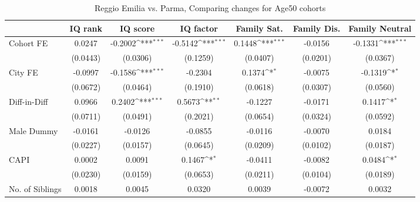 \begin{table}[htbp]\centering
\def\sym#1{\ifmmode^{#1}\else\(^{#1}\)\fi}
\caption{Reggio Emilia vs. Parma, Comparing changes for Age50 cohorts}
\begin{tabular}{l*{6}{c}}
\toprule
            &\multicolumn{1}{c}{IQ rank}&\multicolumn{1}{c}{IQ score}&\multicolumn{1}{c}{IQ factor}&\multicolumn{1}{c}{Family Sat.}&\multicolumn{1}{c}{Family Dis.}&\multicolumn{1}{c}{Family Neutral}\\
\midrule
Cohort FE   &      0.0247         &     -0.2002\sym{***}&     -0.5142\sym{***}&      0.1448\sym{***}&     -0.0156         &     -0.1331\sym{***}\\
            &    (0.0443)         &    (0.0306)         &    (0.1259)         &    (0.0407)         &    (0.0201)         &    (0.0367)         \\
\addlinespace
City FE     &     -0.0997         &     -0.1586\sym{***}&     -0.2304         &      0.1374\sym{*}  &     -0.0075         &     -0.1319\sym{*}  \\
            &    (0.0672)         &    (0.0464)         &    (0.1910)         &    (0.0618)         &    (0.0307)         &    (0.0560)         \\
\addlinespace
Diff-in-Diff&      0.0966         &      0.2402\sym{***}&      0.5673\sym{**} &     -0.1227         &     -0.0171         &      0.1417\sym{*}  \\
            &    (0.0711)         &    (0.0491)         &    (0.2021)         &    (0.0654)         &    (0.0324)         &    (0.0592)         \\
\addlinespace
Male Dummy  &     -0.0161         &     -0.0126         &     -0.0855         &     -0.0116         &     -0.0070         &      0.0184         \\
            &    (0.0227)         &    (0.0157)         &    (0.0645)         &    (0.0209)         &    (0.0102)         &    (0.0187)         \\
\addlinespace
CAPI        &      0.0002         &      0.0091         &      0.1467\sym{*}  &     -0.0411         &     -0.0082         &      0.0484\sym{*}  \\
            &    (0.0230)         &    (0.0159)         &    (0.0653)         &    (0.0211)         &    (0.0104)         &    (0.0189)         \\
\addlinespace
No. of Siblings&      0.0018         &      0.0045         &      0.0320         &      0.0039         &     -0.0072         &      0.0032         \\

\end{tabular}
\end{table}
